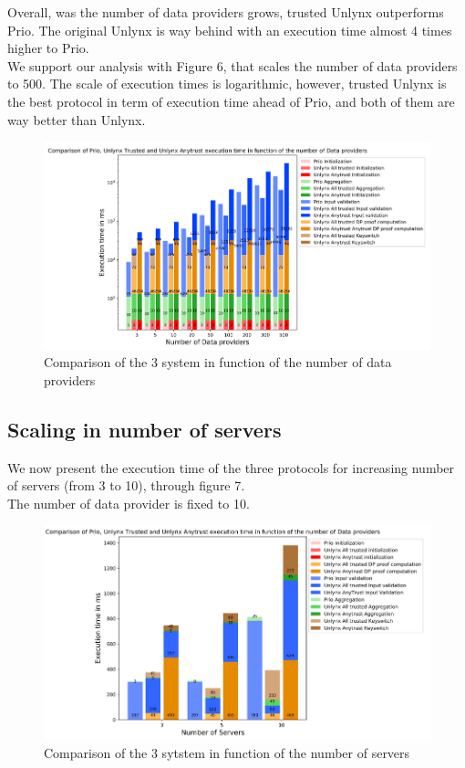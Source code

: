 \documentclass{article}
\begin{document}
Overall, was the number of data providers grows, trusted Unlynx outperforms Prio. The original Unlynx is way behind with an execution time almost 4 times higher to Prio.\\
We support our analysis with Figure 6, that scales the number of data providers to 500. The scale of execution times is logarithmic, however, trusted Unlynx is the best protocol in term of execution time ahead of Prio, and both of them are way better than Unlynx.

\begin{figure}[H]
\centering
\includegraphics[scale=0.7]{img/ComparisonDP.png}
\caption{Comparison of the 3 system in function of the number of data providers}
\end{figure}
 

\subsection{Scaling in number of servers}
We now present the execution time of the three protocols for increasing number of servers (from 3 to 10), through figure 7.\\
The number of data provider is fixed to 10.
\begin{figure}[H]
\centering
\includegraphics[scale=0.7]{img/ComparisonlinearServer.png}
\caption{Comparison of the 3 sytstem in function of the number of servers}
\end{figure}
\end{document}
